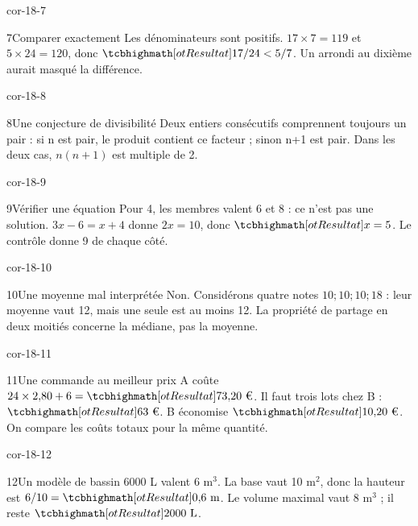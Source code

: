 \begin{blocLivre}{cor-18-7}\begin{corrige}{7}{Comparer exactement}
Les dénominateurs sont positifs. $17\times7=119$ et $5\times24=120$, donc $\res{17/24<5/7}$. Un arrondi au dixième aurait masqué la différence.
\end{corrige}\end{blocLivre}
\begin{blocLivre}{cor-18-8}\begin{corrige}{8}{Une conjecture de divisibilité}
Deux entiers consécutifs comprennent toujours un pair : si n est pair, le produit contient ce facteur ; sinon n+1 est pair. Dans les deux cas, $n(n+1)$ est multiple de 2.
\end{corrige}\end{blocLivre}
\begin{blocLivre}{cor-18-9}\begin{corrige}{9}{Vérifier une équation}
Pour 4, les membres valent 6 et 8 : ce n’est pas une solution. $3x-6=x+4$ donne $2x=10$, donc $\res{x=5}$. Le contrôle donne 9 de chaque côté.
\end{corrige}\end{blocLivre}
\begin{blocLivre}{cor-18-10}\begin{corrige}{10}{Une moyenne mal interprétée}
Non. Considérons quatre notes $10;10;10;18$ : leur moyenne vaut 12, mais une seule est au moins 12. La propriété de partage en deux moitiés concerne la médiane, pas la moyenne.
\end{corrige}\end{blocLivre}
\begin{blocLivre}{cor-18-11}\begin{corrige}{11}{Une commande au meilleur prix}
A coûte $24\times2{,}80+6=\res{73{,}20\text{ €}}$. Il faut trois lots chez B : $\res{63\text{ €}}$. B économise $\res{10{,}20\text{ €}}$. On compare les coûts totaux pour la même quantité.
\end{corrige}\end{blocLivre}
\begin{blocLivre}{cor-18-12}\begin{corrige}{12}{Un modèle de bassin}
6000 L valent 6 m$^3$. La base vaut 10 m$^2$, donc la hauteur est $6/10=\res{0{,}6\text{ m}}$. Le volume maximal vaut 8 m$^3$ ; il reste $\res{2000\text{ L}}$.
\label{fig-cor-18-12}
\end{corrige}\end{blocLivre}
